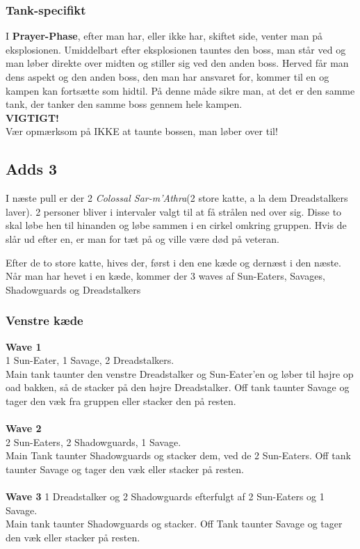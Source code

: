 \subsubsection*{Tank-specifikt}
I \textbf{Prayer-Phase}, efter man har, eller ikke har, skiftet side, venter
man på eksplosionen. Umiddelbart efter eksplosionen tauntes den boss, man står
ved og man løber direkte over midten og stiller sig ved den anden boss. Herved
får man dens aspekt og den anden boss, den man har ansvaret for, kommer til en
og kampen kan fortsætte som hidtil. På denne måde sikre man, at det er den
samme tank, der tanker den samme boss gennem hele kampen.\\
\textbf{VIGTIGT!}\\
Vær opmærksom på IKKE at taunte bossen, man løber over til!

\subsection*{Adds 3}
I næste pull er der 2 \emph{Colossal Sar-m'Athra}(2 store katte, a la dem
Dreadstalkers laver). 2 personer bliver i intervaler valgt til at få strålen
ned over sig. Disse to skal løbe hen til hinanden og løbe sammen i en cirkel
omkring gruppen. Hvis de slår ud efter en, er man for tæt på og ville være død
på veteran.

Efter de to store katte, hives der, først i den ene kæde og dernæst i den
næste. Når man har hevet i en kæde, kommer der 3 waves af Sun-Eaters, Savages,
Shadowguards og Dreadstalkers

\subsubsection*{Venstre kæde}
\textbf{Wave 1}\\
1 Sun-Eater, 1 Savage, 2 Dreadstalkers.\\
Main tank taunter den venstre
Dreadstalker og Sun-Eater'en og løber til højre op oad bakken, så de stacker på
den højre Dreadstalker. Off tank taunter Savage og tager den væk fra gruppen
eller stacker den på resten.\\
\\
\textbf{Wave 2}\\
2 Sun-Eaters, 2 Shadowguards, 1 Savage.\\
Main Tank taunter Shadowguards og
stacker dem, ved de 2 Sun-Eaters. Off tank taunter Savage og tager den væk
eller stacker på resten.\\
\\
\textbf{Wave 3}
1 Dreadstalker og 2 Shadowguards efterfulgt af 2 Sun-Eaters og 1 Savage.\\
Main tank taunter Shadowguards og stacker. Off Tank taunter Savage og tager den
væk eller stacker på resten.

